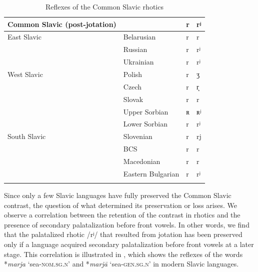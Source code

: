 \documentclass[output=paper]{langscibook}
\begin{document}
\begin{table}
\begin{tabularx}{\textwidth}{lXll}
\lsptoprule
Common Slavic (post-jotation) &  & r & rʲ\\
\midrule
East Slavic & Belarusian & r & r\\
& Russian & r & rʲ\\
& Ukrainian & r & rʲ\\
\tablevspace
West Slavic & Polish & r & ʒ\\
& Czech & r & r̝\\
& Slovak & r & r\\
& Upper Sorbian & ʀ & ʀʲ\\
& Lower Sorbian & r & rʲ\\
\tablevspace
South Slavic & Slovenian & r & rj\\
& BCS & r & r\\
& Macedonian & r & r\\
& Eastern Bulgarian & r & rʲ\\
\lspbottomrule
\end{tabularx}
\caption{Reflexes of the Common Slavic rhotics}
\label{tab:kavitskaya:1}
\end{table}

Since only a few Slavic languages have fully preserved the Common Slavic contrast, the question of what determined its preservation or loss arises. We observe a correlation between the retention of the contrast in rhotics and the presence of secondary palatalization before front vowels. In other words, we find that the palatalized rhotic /rʲ/ that resulted from jotation has been preserved only if a language acquired secondary palatalization before front vowels at a later stage. This correlation is illustrated in , which shows the reflexes of the words *\textit{marja} ‘sea-\textsc{nom.sg.n}’ and *\textit{marjā} ‘sea-\textsc{gen.sg.n}’ in modern Slavic languages.
\end{document}
